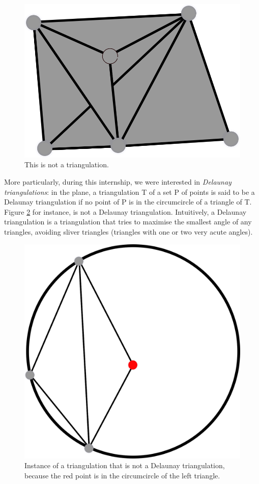 \documentclass[a4paper,10pt]{article}
\begin{document}
\begin{figure}
  \centering
  \includegraphics[scale=2]{NotTrig2}
  \caption{\label{NotTrig2} This is not a triangulation.}
\end{figure}


More particularly, during this internship, we were interested in \emph{Delaunay triangulations}: in the plane, a triangulation T of a set P of points is said to be a Delaunay triangulation if no point of P is in the circumcircle of a triangle of T. Figure \ref{notDelaunay} for instance, is not a Delaunay triangulation. Intuitively, a Delaunay triangulation is a triangulation that tries to maximise the smallest angle of any triangles, avoiding sliver triangles (triangles with one or two very acute angles).
\label{DelaunayCondition}
\begin{figure}
\centering
\includegraphics[scale=1]{dessin2}
\caption{\label{notDelaunay} Instance of a triangulation that is not a Delaunay triangulation, because the red point is in the circumcircle of the left triangle.}

\end{figure}
\end{document}
